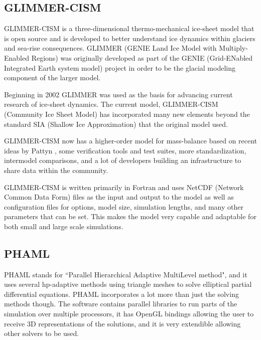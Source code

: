 \subsection{GLIMMER-CISM}\label{sec:chp2cism}

GLIMMER-CISM is a three-dimensional thermo-mechanical ice-sheet model that is open source and is developed to better understand ice dynamics within glaciers and sea-rise consequences.  GLIMMER (GENIE Land Ice Model with Multiply-Enabled Regions) was originally developed as part of the GENIE (Grid-ENabled Integrated Earth system model) project in order to be the glacial modeling component of the larger model.\citep{glimmerdoc}

Beginning in 2002 GLIMMER was used as the basis for advancing current research of ice-sheet dynamics.  The current model, GLIMMER-CISM (Community Ice Sheet Model) has incorporated many new elements beyond the standard SIA (Shallow Ice Approximation) that the original model used. 
\citep{cismwiki:website}

GLIMMER-CISM now has a higher-order model for mass-balance based on recent ideas by Pattyn \citep{Pattyn:2003}, some verification tools and test suites, more standardization, intermodel comparisons, and a lot of developers building an infrastructure to share data within the community.

GLIMMER-CISM is written primarily in Fortran and uses NetCDF (Network Common Data Form) files as the input and output to the model as well as configuration files for options, model size, simulation lengths, and many other parameters that can be set.  This makes the model very capable and adaptable for both small and large scale simulations. 



\subsection{PHAML}\label{sec:ch2phaml}

PHAML stands for ``Parallel Hierarchical Adaptive MultiLevel method", and it uses several hp-adaptive methods using triangle meshes to solve elliptical partial differential equations.  PHAML incorporates a lot more than just the solving methods though.  The software contains parallel libraries to run parts of the simulation over multiple processors, it has OpenGL bindings allowing the user to receive 3D representations of the solutions, and it is very extendible allowing other solvers to be used.

